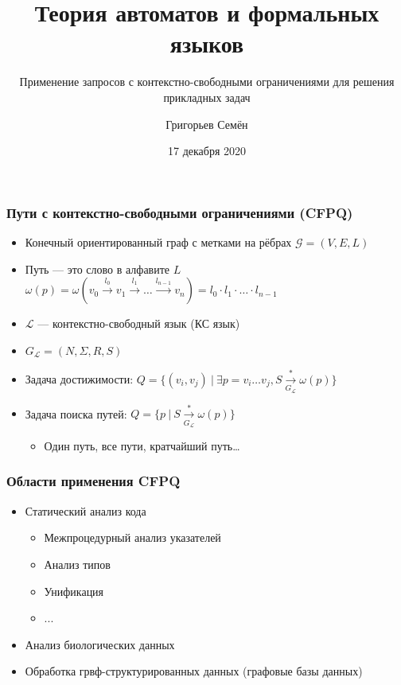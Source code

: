 \documentclass{beamer}
\title[]{Теория автоматов и формальных языков}
\subtitle[]{Применение запросов с контекстно-свободными ограничениями для решения прикладных задач}
\institute[]{
Санкт-Петербургский государственный университет\\
}
\author[]{Григорьев Семён}
\date{17 декабря 2020}
\begin{document}
{
  \begin{frame}
    \titlepage
  \end{frame}
}

\begin{frame}[fragile]  
  \frametitle{Пути с контекстно-свободными ограничениями (CFPQ)}
   \begin{itemize}
      \item Конечный ориентированный граф с метками на рёбрах $\mathcal{G} = (V,E,L)$
      \item Путь --- это слово в алфавите $L$ $\omega(p) = \omega(v_0 \xrightarrow{l_0} v_1 \xrightarrow{l_1} \dots \xrightarrow{l_{n-1}} v_n ) = l_0 \cdot l_1 \cdot \ldots \cdot l_{n-1}$
      \item $\mathcal{L}$ --- контекстно-свободный язык (КС язык)
      \item $G_{\mathcal{L}} = (N,\Sigma,R,S)$
    \end{itemize}
    \pause
    \begin{itemize}
      \item Задача достижимости: $Q=\{(v_i,v_j) \ | \ \exists p = v_i \dots v_j, S \xrightarrow[G_{\mathcal{L}}]{*} \omega(p) \}$
      \item Задача поиска путей: $Q=\{p \ | \ S \xrightarrow[G_{\mathcal{L}}]{*} \omega(p)\}$
      \begin{itemize}
        \item Один путь, все пути, кратчайший путь\dots
      \end{itemize}
    \end{itemize}

\end{frame}


\begin{frame}[fragile]
  \frametitle{Области применения CFPQ}
    \begin{itemize}
      \item Статический анализ кода
      \begin{itemize}
        \item Межпроцедурный анализ указателей
        \item Анализ типов
        \item Унификация
        \item ...
      \end{itemize}    
      \item Анализ биологических данных
      \item Обработка грвф-структурированных данных (графовые базы данных)
  \end{itemize}
\end{frame}
\end{document}
